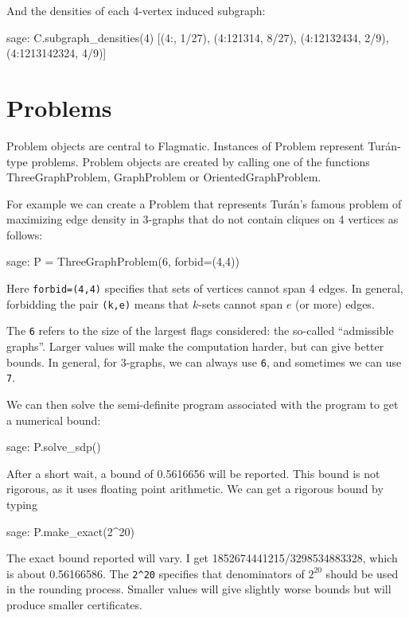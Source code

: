 \documentclass{article}
\providecommand{\flagmatic}{Flagmatic}
\begin{document}
And the densities of each 4-vertex induced subgraph:

\begin{sage}
sage: C.subgraph_densities(4)
[(4:, 1/27), (4:121314, 8/27), (4:12132434, 2/9), (4:1213142324, 4/9)]
\end{sage}

\section{Problems}

Problem objects are central to \flagmatic. Instances of Problem represent Turán-type problems. Problem objects are created by calling one of the functions ThreeGraphProblem, GraphProblem or OrientedGraphProblem.

For example we can create a Problem that represents Turán's famous problem of maximizing edge density in 3-graphs that do not contain cliques on 4 vertices as follows:

\begin{sage}
sage: P = ThreeGraphProblem(6, forbid=(4,4))
\end{sage}

Here \verb|forbid=(4,4)| specifies that sets of vertices cannot span 4 edges. In general, forbidding the pair \verb|(k,e)| means that $k$-sets cannot span $e$ (or more) edges. 

The \verb|6| refers to the size of the largest flags considered: the so-called ``admissible graphs''. Larger values will make the computation harder, but can give better bounds. In general, for 3-graphs, we can always use \verb|6|, and sometimes we can use \verb|7|.

We can then solve the semi-definite program associated with the program to get a numerical bound:

\begin{sage}
sage: P.solve_sdp()
\end{sage}

After a short wait, a bound of 0.5616656 will be reported. This bound is not rigorous, as it uses floating point arithmetic. We can get a rigorous bound by typing

\begin{sage}
sage: P.make_exact(2^20)
\end{sage}

The exact bound reported will vary. I get 1852674441215/3298534883328, which is about 0.56166586. The \verb|2^20| specifies that denominators of $2^{20}$ should be used in the rounding process. Smaller values will give slightly worse bounds but will produce smaller certificates.
\end{document}
